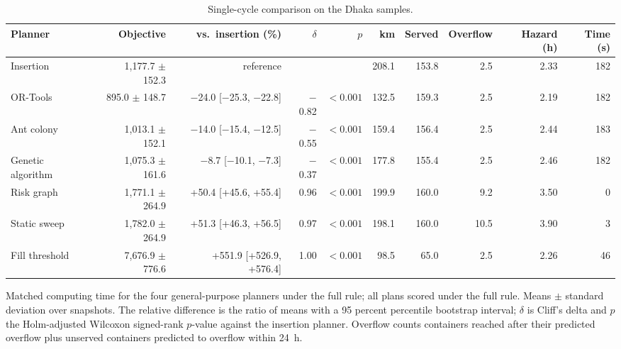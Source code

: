 \begin{table}[!htbp]
\caption{Single-cycle comparison on the Dhaka samples.}
\label{tab:main}
\centering
\footnotesize
\setlength{\tabcolsep}{3pt}
\begin{tabular}{lrrrrrrrrr}
\toprule
Planner & Objective & vs.\ insertion (\%) & $\delta$ & $p$ & km & Served & Overflow & Hazard (h) & Time (s) \\
\midrule
Insertion & 1{,}177.7 $\pm$ 152.3 & reference &  &  & 208.1 & 153.8 & 2.5 & 2.33 & 182 \\
OR-Tools & 895.0 $\pm$ 148.7 & \ensuremath{-}24.0 [\ensuremath{-}25.3, \ensuremath{-}22.8] & \ensuremath{-}0.82 & $<0.001$ & 132.5 & 159.3 & 2.5 & 2.19 & 182 \\
Ant colony & 1{,}013.1 $\pm$ 152.1 & \ensuremath{-}14.0 [\ensuremath{-}15.4, \ensuremath{-}12.5] & \ensuremath{-}0.55 & $<0.001$ & 159.4 & 156.4 & 2.5 & 2.44 & 183 \\
Genetic algorithm & 1{,}075.3 $\pm$ 161.6 & \ensuremath{-}8.7 [\ensuremath{-}10.1, \ensuremath{-}7.3] & \ensuremath{-}0.37 & $<0.001$ & 177.8 & 155.4 & 2.5 & 2.46 & 182 \\
Risk graph & 1{,}771.1 $\pm$ 264.9 & +50.4 [+45.6, +55.4] & 0.96 & $<0.001$ & 199.9 & 160.0 & 9.2 & 3.50 & 0 \\
Static sweep & 1{,}782.0 $\pm$ 264.9 & +51.3 [+46.3, +56.5] & 0.97 & $<0.001$ & 198.1 & 160.0 & 10.5 & 3.90 & 3 \\
Fill threshold & 7{,}676.9 $\pm$ 776.6 & +551.9 [+526.9, +576.4] & 1.00 & $<0.001$ & 98.5 & 65.0 & 2.5 & 2.26 & 46 \\
\bottomrule
\end{tabular}
\par\smallskip\footnotesize Matched computing time for the four general-purpose planners under the full rule; all plans scored under the full rule. Means $\pm$ standard deviation over snapshots. The relative difference is the ratio of means with a 95 percent percentile bootstrap interval; $\delta$ is Cliff's delta and $p$ the Holm-adjusted Wilcoxon signed-rank $p$-value against the insertion planner. Overflow counts containers reached after their predicted overflow plus unserved containers predicted to overflow within 24~h.
\end{table}
